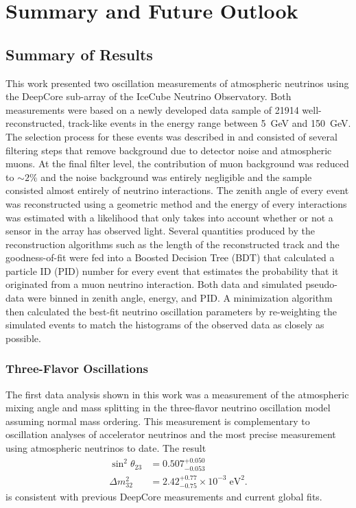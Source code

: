 \setchapterpreamble[u]{\margintoc}
\chapter{Summary and Future Outlook}

\section{Summary of Results}
\label{sec:summary}

This work presented two oscillation measurements of atmospheric neutrinos using the DeepCore sub-array of the IceCube Neutrino Observatory. Both measurements were based on a newly developed data sample of \num{21914} well-reconstructed, track-like events in the energy range between \SI{5}{\giga\electronvolt} and \SI{150}{\giga\electronvolt}. The selection process for these events was described in  and consisted of several filtering steps that remove background due to detector noise and atmospheric muons. At the final filter level, the contribution of muon background was reduced to $\sim2\%$ and the noise background was entirely negligible and the sample consisted almost entirely of neutrino interactions. The zenith angle of every event was reconstructed using a geometric method and the energy of every interactions was estimated with a likelihood that only takes into account whether or not a sensor in the array has observed light. %
Several quantities produced by the reconstruction algorithms such as the length of the reconstructed track and the goodness-of-fit were fed into a Boosted Decision Tree (BDT) that calculated a particle ID (PID) number for every event that estimates the probability that it originated from a muon neutrino interaction. Both data and simulated pseudo-data were binned in zenith angle, energy, and PID. A minimization algorithm then calculated the best-fit neutrino oscillation parameters by re-weighting the simulated events to match the histograms of the observed data as closely as possible.

\subsection{Three-Flavor Oscillations}
\label{sec:summary-three-flavor}

The first data analysis shown in this work was a measurement of the atmospheric mixing angle and mass splitting in the three-flavor neutrino oscillation model assuming normal mass ordering. This measurement is complementary to oscillation analyses of accelerator neutrinos and the most precise measurement using atmospheric neutrinos to date. The result
\begin{align*}
    \sin^2\theta_{23} &= 0.507_{-0.053}^{+0.050}\\
    \Delta m^2_{32} &= 2.42_{-0.75}^{+0.77} \times10^{-3}\;\mathrm{eV}^2.
\end{align*}
is consistent with previous DeepCore measurements and current global fits.


